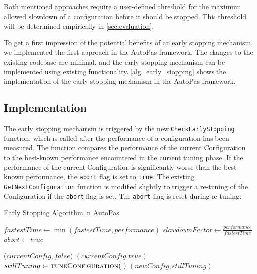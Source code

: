 \documentclass[conference]{IEEEtran}
\begin{document}
Both mentioned approaches require a user-defined threshold for the maximum allowed slowdown of a configuration before it should be stopped. This threshold will be determined empirically in \autoref{sec:evaluation}.

To get a first impression of the potential benefits of an early stopping mechanism, we implemented the first approach in the AutoPas framework. The changes to the existing codebase are minimal, and the early-stopping mechanism can be implemented using existing functionality. \autoref{alg_early_stopping} shows the implementation of the early stopping mechanism in the AutoPas framework.

\subsection{Implementation}
The early stopping mechanism is triggered by the new \texttt{CheckEarlyStopping} function, which is called after the performance of a configuration has been measured. The function compares the performance of the current Configuration to the best-known performance encountered in the current tuning phase. If the performance of the current Configuration is significantly worse than the best-known performance, the \texttt{abort} flag is set to \texttt{true}. The existing \texttt{GetNextConfiguration} function is modified slightly to trigger a re-tuning of the Configuration if the \texttt{abort} flag is set. The \texttt{abort} flag is reset during re-tuning.



\begin{algorithm}[H]
    \small
    \caption{Early Stopping Algorithm in AutoPas}
    \label{alg_early_stopping}
    \begin{algorithmic}[1]
        \State $fastestTime \gets \min(fastestTime, performance)$
        \State $slowdownFactor \gets \frac{performance}{fastestTime}$
        \State $abort \gets true$
        \EndIf
        \EndProcedure

        \vspace{0.5em}

        \State \Return ($currentConfig, false)$
            \State \Return $(currentConfig, true)$
            \Else
            \State $stillTuning \gets \Call{tuneConfiguration}{~}$
            \State \Return $(newConfig, stillTuning)$
        \EndIf
        \EndProcedure
    \end{algorithmic}

\end{algorithm}
\end{document}
